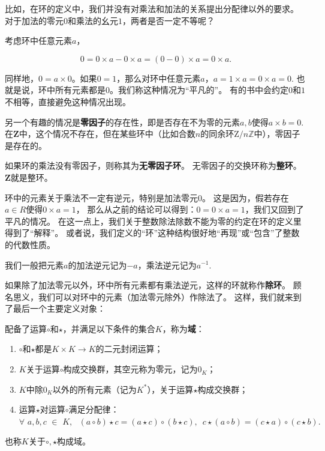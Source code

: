 \documentclass[12pt,UTF8,fontset=none]{ctexbook}
\begin{document}
\begin{appendix}
比如，在环的定义中，我们并没有对乘法和加法的关系提出分配律以外的要求。
对于加法的零元$0$和乘法的幺元$1$，两者是否一定不等呢？

考虑环中任意元素$a$，

$$ 0 = 0\times a - 0\times a = (0 - 0)\times a = 0 \times a.$$

同样地，$0 = a\times 0$。如果$0 = 1$，那么对环中任意元素$a$，$a = 1\times a = 0\times a = 0$.
也就是说，环中所有元素都是$0$。我们称这种情况为“平凡的”。
有的书中会约定$0$和$1$不相等，直接避免这种情况出现。

另一个有趣的情况是\textbf{零因子}的存在性，即是否存在不为零的元素$a, b$使得$a\times b = 0$.
在$\mathbf{Z}$中，这个情况不存在，但在某些环中（比如合数$n$的同余环$\mathrm{Z}/n\mathbb{Z}$中），零因子是存在的。

如果环的乘法没有零因子，则称其为\textbf{无零因子环}。
无零因子的交换环称为\textbf{整环}。$\mathbf{Z}$就是整环。

环中的元素关于乘法不一定有逆元，特别是加法零元$0$。
这是因为，假若存在$a\in R$使得$0\times a = 1$，
那么从之前的结论可以得到：$0 = 0\times a = 1$，我们又回到了平凡的情况。
在这一点上，我们关于整数除法除数不能为零的约定在环的定义里得到了“解释”。
或者说，我们定义的“环”这种结构很好地“再现”或“包含”了整数的代数性质。

我们一般把元素$a$的加法逆元记为$-a$，乘法逆元记为$a^{-1}$.

如果除了加法零元以外，环中所有元素都有乘法逆元，这样的环就称作\textbf{除环}。
顾名思义，我们可以对环中的元素（加法零元除外）作除法了。
这样，我们就来到了最后一个主要定义对象：

\begin{df}\label{df:0_3}
    配备了运算$\circ$和$\star$，并满足以下条件的集合$K$，称为\textbf{域}：

    \begin{enumerate}
        \item $\circ$和$\star$都是$K \times K \rightarrow K$的二元封闭运算；
        \item $K$关于运算$\circ$构成交换群，其空元称为零元，记为$0_{K}$；
        \item $K$中除$0_{K}$以外的所有元素（记为$K^*$），关于运算$\star$构成交换群；
        \item 运算$\star$对运算$\circ$满足分配律：$\forall \,\, a, b, c \,\, \in \,\, K, \,\,\,\, (a \circ b) \star c = (a \star c) \circ (b \star c), \,\,\, c\star (a \circ b) = (c \star a) \circ (c \star b).$
    \end{enumerate}
    也称$K$关于$\circ, \star$构成域。
\end{df}


\end{appendix}
\end{document}
